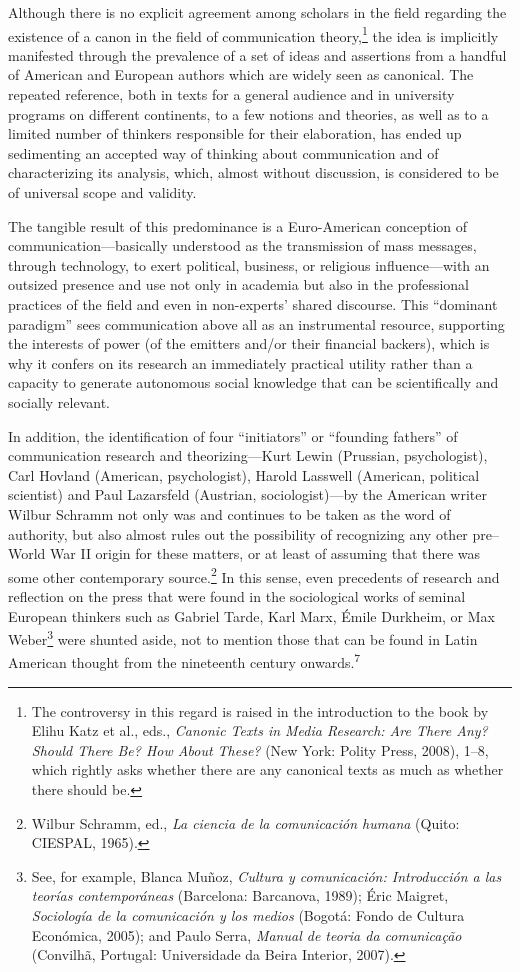 \documentclass{tufte-handout}
\begin{document}
Although there is no explicit agreement among scholars in the field
regarding the existence of a canon in the field of communication
theory,\footnote{The controversy in this regard is raised in the
  introduction to the book by Elihu Katz et al., eds., \emph{Canonic
  Texts in Media Research: Are There Any? Should There Be? How About
  These?} (New York: Polity Press, 2008), 1--8, which rightly asks
  whether there are any canonical texts as much as whether there should
  be.} the idea is implicitly manifested through the prevalence of a set
of ideas and assertions from a handful of American and European authors
which are widely seen as canonical. The repeated reference, both in
texts for a general audience and in university programs on different
continents, to a few notions and theories, as well as to a limited
number of thinkers responsible for their elaboration, has ended up
sedimenting an accepted way of thinking about communication and of
characterizing its analysis, which, almost without discussion, is
considered to be of universal scope and validity.

The tangible result of this predominance is a Euro-American conception
of communication---basically understood as the transmission of mass
messages, through technology, to exert political, business, or religious
influence---with an outsized presence and use not only in academia but
also in the professional practices of the field and even in non-experts'
shared discourse. This ``dominant paradigm'' sees communication above
all as an instrumental resource, supporting the interests of power (of
the emitters and/or their financial backers), which is why it confers on
its research an immediately practical utility rather than a capacity to
generate autonomous social knowledge that can be scientifically and
socially relevant.

In addition, the identification of four ``initiators'' or ``founding
fathers'' of communication research and theorizing---Kurt Lewin
(Prussian, psychologist), Carl Hovland (American, psychologist), Harold
Lasswell (American, political scientist) and Paul Lazarsfeld (Austrian,
sociologist)---by the American writer Wilbur Schramm not only was and
continues to be taken as the word of authority, but also almost rules
out the possibility of recognizing any other pre--World War II origin
for these matters, or at least of assuming that there was some other
contemporary source.\footnote{Wilbur Schramm, ed., \emph{La ciencia de
  la comunicación humana} (Quito: CIESPAL, 1965).} In this sense, even
precedents of research and reflection on the press that were found in
the sociological works of seminal European thinkers such as Gabriel
Tarde, Karl Marx, Émile Durkheim, or Max Weber\footnote{See, for
  example, Blanca Muñoz, \emph{Cultura y comunicación: Introducción a
  las teorías contemporáneas} (Barcelona: Barcanova, 1989); Éric
  Maigret, \emph{Sociología de la comunicación y los medios} (Bogotá:
  Fondo de Cultura Económica, 2005); and Paulo Serra, \emph{Manual de
  teoria da comunicação} (Convilhã, Portugal: Universidade da Beira
  Interior, 2007).} were shunted aside, not to mention those that can be
found in Latin American thought from the nineteenth century
onwards.\textsuperscript{7}
\end{document}
